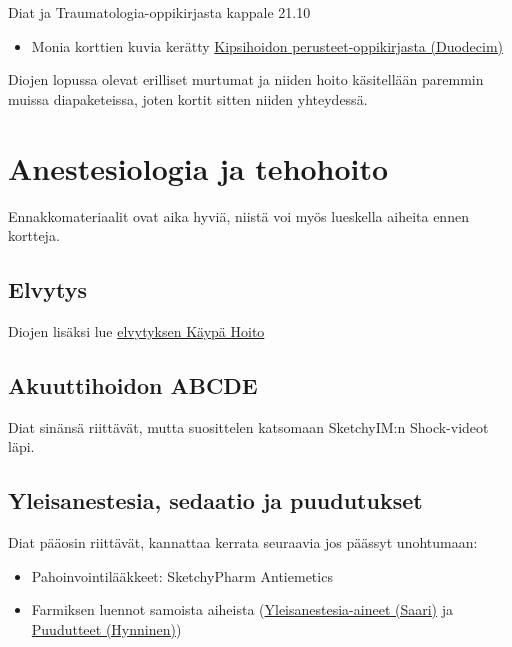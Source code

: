 \documentclass[
]{book}
\providecommand{\tightlist}{%
  \setlength{\itemsep}{0pt}\setlength{\parskip}{0pt}}
\begin{document}
Diat ja Traumatologia-oppikirjasta kappale 21.10

\begin{itemize}
\tightlist
\item
  Monia korttien kuvia kerätty \href{https://www.oppiportti.fi/oppikirjat/kps00001}{Kipsihoidon perusteet-oppikirjasta (Duodecim)}
\end{itemize}

Diojen lopussa olevat erilliset murtumat ja niiden hoito käsitellään paremmin muissa diapaketeissa, joten kortit sitten niiden yhteydessä.

\chapter{Anestesiologia ja tehohoito}\label{anestesiologia-ja-tehohoito}

Ennakkomateriaalit ovat aika hyviä, niistä voi myös lueskella aiheita ennen kortteja.

\section{Elvytys}\label{elvytys}

Diojen lisäksi lue \href{https://www.kaypahoito.fi/hoi17010}{elvytyksen Käypä Hoito}

\section{Akuuttihoidon ABCDE}\label{akuuttihoidon-abcde}

Diat sinänsä riittävät, mutta suosittelen katsomaan SketchyIM:n Shock-videot läpi.

\section{Yleisanestesia, sedaatio ja puudutukset}\label{yleisanestesia-sedaatio-ja-puudutukset}

Diat pääosin riittävät, kannattaa kerrata seuraavia jos päässyt unohtumaan:

\begin{itemize}
\tightlist
\item
  Pahoinvointilääkkeet: SketchyPharm Antiemetics
\item
  Farmiksen luennot samoista aiheista (\href{images/250313_Yleisanestesia-aineet_Saari.pdf}{Yleisanestesia-aineet (Saari)} ja \href{images/250312_Puudutusaineet_Hynninen.pdf}{Puudutteet (Hynninen)})
\end{itemize}
\end{document}
